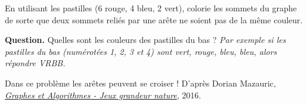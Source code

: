 \documentclass[class=report,crop=false, 12pt]{standalone}
\begin{document}
\begin{enigme}[Graphe]

En utilisant les pastilles (6 rouge, 4 bleu, 2 vert), colorie les sommets du graphe de sorte que deux sommets reliés par une arête ne soient pas de la même couleur.



\bigskip

\textbf{Question.} Quelles sont les couleurs des pastilles du bas ?
\emph{Par exemple si les pastilles du bas (numérotées 1, 2, 3 et 4) sont vert, rouge, bleu, bleu, alors répondre VRBB.}

\bigskip

{\footnotesize Dans ce problème les arêtes peuvent se croiser ! D'après Dorian Mazauric, \href{https://hal.inria.fr/hal-01366804}{\emph{Graphes et Algorithmes - Jeux grandeur nature}}, 2016.}

%
%

\end{enigme}


%
\end{document}
